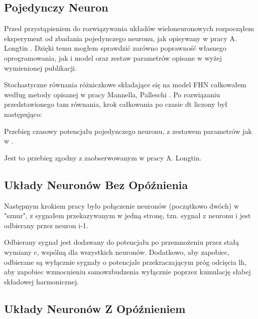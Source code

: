 \documentclass[12pt]{article}
\begin{document}
  \subsection{Pojedynczy Neuron}
  
  Przed przystąpieniem do rozwiązywania układów wieloneuronowych rozpocząłem eksperyment od zbadania pojedynczego neuronu, jak opisywany w pracy A. Longtin \cite{longtin}. Dzięki temu mogłem sprawdzić zarówno poprawność własnego oprogramowania, jak i model oraz zestaw parametrów opisane w wyżej wymienionej publikacji.
  
  Stochastyczne równania różniczkowe składające się na model FHN całkowałem według metody opisanej w pracy Mannella, Palleschi \cite{mannella}. Po rozwiązaniu przedstawionego tam równania, krok całkowania po czasie dt liczony był następująco:
  
  Przebieg czasowy potencjału pojedynczego neuronu, z zestawem parametrów jak w \cite{longtin}.
  
  
  Jest to przebieg zgodny z zaobserwowanym w pracy A. Longtin.
  
  \subsection{Układy Neuronów Bez Opóźnienia}
  
  Następnym krokiem pracy było połączenie neuronów (początkowo dwóch) w "sznur", z sygnałem przekazywanym w jedną stronę, tzn. sygnał z neuronu i jest odbierany przez neuron i-1.
  
  Odbierany sygnał jest dodawany do potencjału po przemnożeniu przez stałą wymiany c, wspólną dla wszystkich neuronów. Dodatkowo, aby zapobiec, odbierane są wyłącznie sygnały o potencjale przekraczającym próg odcięcia lh, aby zapobiec wzmocnieniu samowzbudzenia wyłącznie poprzez kumulację słabej składowej harmonicznej.
  
  \subsection{Układy Neuronów Z Opóźnieniem}
  
  
  \newpage
  
  
  
  
  
\end{document}
